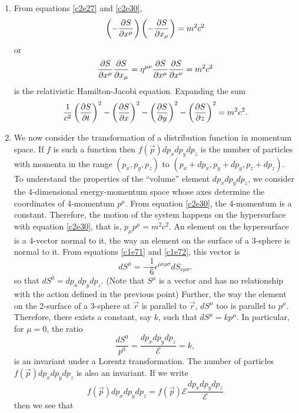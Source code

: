 \begin{enumerate}
\item From equations \eqref{c2e27} and \eqref{c2e30},
\[
\left(-\frac{\partial{S}}{\partial{x^\mu}}\right)\left(-\frac{\partial{S}}{\partial{x_\mu}}\right) = m^2c^2
\]
or
\begin{equation}\label{c2e34}
\frac{\partial{S}}{\partial{x^\mu}}\frac{\partial{S}}{\partial{x_\mu}} = \eta^{\mu\nu}\frac{\partial{S}}{\partial{x^\mu}}\frac{\partial{S}}{\partial{x^\nu}} 
= m^2c^2
\end{equation}
is the relativistic Hamilton-Jacobi equation. Expanding the sum
\begin{equation}\label{c2e35}
\frac{1}{c^2}\left(\frac{\partial{S}}{\partial{t}}\right)^2 - \left(\frac{\partial{S}}{\partial{x}}\right)^2 
- \left(\frac{\partial{S}}{\partial{y}}\right)^2 - \left(\frac{\partial{S}}{\partial{z}}\right)^2 = m^2c^2.
\end{equation}

\item We now consider the transformation of a distribution function in momentum
space. If $f$ is such a function then $f(\vec{p})dp_xdp_ydp_z$ is the number of
particles with momenta in the range $(p_x, p_y, p_z)$ to $(p_x + dp_x, p_y + 
dp_y, p_z + dp_z)$. To understand the properties of the ``volume'' element 
$dp_xdp_ydp_z$, we consider the 4-dimensional energy-momentum space whose axes 
determine the coordinates of 4-momentum $p^\mu$. From equation \eqref{c2e30}, 
the 4-momentum is a constant. Therefore, the motion of the system happens on 
the hypersurface with equation \eqref{c2e30}, that is, $p_\mu p^\mu = m^2c^2$. 
An element on the hypersurface is a 4-vector normal to it, the way an element 
on the surface of a 3-sphere is normal to it. From equations \eqref{c1e71} 
and \eqref{c1e72}, this vector is
\begin{equation}\label{c2e36}
dS^\mu = -\frac{1}{6}\epsilon^{\mu\nu\rho\sigma}dS_{\nu\rho\sigma}.
\end{equation}
so that $dS^0 = dp_xdp_ydp_z$. (Note that $S^\mu$ is a vector and has no
relationship with the action defined in the previous point) Further, the way 
the element on the 2-surface of a 3-sphere at $\vec{r}$ is parallel to 
$\vec{r}$, $dS^\mu$ too is parallel to $p^\mu$. Therefore, there exists a 
constant, say $k$, such that $dS^\mu = kp^\mu$. In particular, for $\mu = 0$, 
the ratio
\begin{equation}\label{c2e37}
\frac{dS^0}{p^0} = \frac{dp_xdp_ydp_z}{\mathcal{E}} = k,
\end{equation}
is an invariant under a Lorentz transformation. The number of particles 
$f(\vec{p}) dp_xdp_ydp_z$ is also an invariant. If we write
\[
f(\vec{p})dp_xdp_ydp_z = f(\vec{p})\mathcal{E}\frac{dp_xdp_ydp_z}{\mathcal{E}}
\]
then we see that
\[
\]
\end{enumerate}
